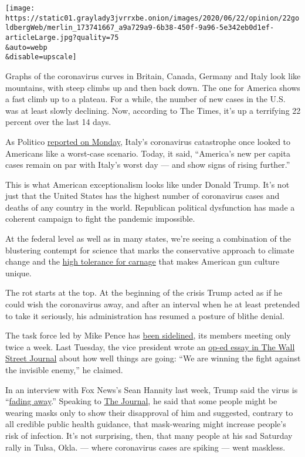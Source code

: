 \texttt{[image: https://static01.graylady3jvrrxbe.onion/images/2020/06/22/opinion/22goldbergWeb/merlin\_173741667\_a9a729a9-6b38-450f-9a96-5e342eb0d1ef-articleLarge.jpg?quality=75\\\&auto=webp\\\&disable=upscale]}

Graphs of the coronavirus curves in Britain, Canada, Germany and Italy
look like mountains, with steep climbs up and then back down. The one
for America shows a fast climb up to a plateau. For a while, the number
of new cases in the U.S. was at least slowly declining. Now, according
to The Times, it's up a terrifying 22 percent over the last 14 days.

As Politico
\href{https://www.politico.com/news/2020/06/22/united-states-italy-traded-places-coronavirus-333122}{reported
on Monday}, Italy's coronavirus catastrophe once looked to Americans
like a worst-case scenario. Today, it said, ``America's new per capita
cases remain on par with Italy's worst day --- and show signs of rising
further.''

This is what American exceptionalism looks like under Donald Trump. It's
not just that the United States has the highest number of coronavirus
cases and deaths of any country in the world. Republican political
dysfunction has made a coherent campaign to fight the pandemic
impossible.

At the federal level as well as in many states, we're seeing a
combination of the blustering contempt for science that marks the
conservative approach to climate change and the
\href{https://www.nytimes3xbfgragh.onion/2020/05/05/opinion/coronavirus-deaths.html}{high
tolerance for carnage} that makes American gun culture unique.

The rot starts at the top. At the beginning of the crisis Trump acted as
if he could wish the coronavirus away, and after an interval when he at
least pretended to take it seriously, his administration has resumed a
posture of blithe denial.

The task force led by Mike Pence has
\href{https://www.cnn.com/2020/05/28/politics/donald-trump-coronavirus-task-force/index.html}{been
sidelined}, its members meeting only twice a week. Last Tuesday, the
vice president wrote an
\href{https://www.wsj.com/articles/there-isnt-a-coronavirus-second-wave-11592327890}{op-ed
essay in The Wall Street Journal} about how well things are going: ``We
are winning the fight against the invisible enemy,'' he claimed.

In an interview with Fox News's Sean Hannity last week, Trump said the
virus is
``\href{https://www.foxnews.com/media/trump-hannity-coronavirus-fading-away-tulsa-rally}{fading
away}.'' Speaking to
\href{https://www.wsj.com/articles/trump-talks-juneteenth-john-bolton-economy-in-wsj-interview-11592493771}{The
Journal}, he said that some people might be wearing masks only to show
their disapproval of him and suggested, contrary to all credible public
health guidance, that mask-wearing might increase people's risk of
infection. It's not surprising, then, that many people at his sad
Saturday rally in Tulsa, Okla. --- where coronavirus cases are spiking
--- went maskless.

